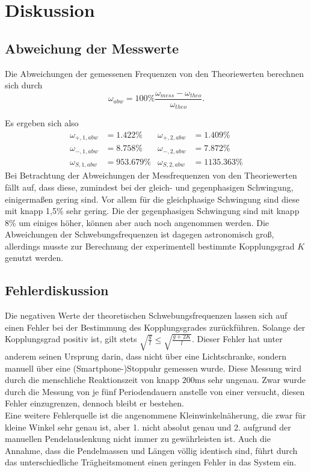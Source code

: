 \section{Diskussion}
\label{sec:Diskussion}

\subsection{Abweichung der Messwerte}
Die Abweichungen der gemessenen Frequenzen von den Theoriewerten berechnen sich durch
\begin{equation}
    ω_{abw} = 100\% \frac{ω_{mess}-ω_{theo}}{ω_{theo}} \text{.}
\end{equation}

Es ergeben sich also
\begin{align}
ω_{+,1,abw} & = 1.422\%   & ω_{+,2,abw} & = 1.409\% \\
ω_{-,1,abw} & = 8.758\%   & ω_{-,2,abw} & = 7.872\%\\
ω_{S,1,abw} & = 953.679\% & ω_{S,2,abw} & = 1135.363\%
\end{align}
Bei Betrachtung der Abweichungen der Messfrequenzen von den Theoriewerten fällt auf, dass diese, zumindest
bei der gleich- und gegenphasigen Schwingung, einigermaßen gering sind. Vor allem für die gleichphasige Schwingung
sind diese mit knapp 1,5\% sehr gering. Die der gegenphasigen Schwingung sind mit knapp 8\% um einiges höher, können aber auch noch angenommen werden.
Die Abweichungen der Schwebungsfrequenzen ist dagegen astronomisch groß, allerdings musste zur Berechnung der experimentell
bestimmte Kopplungsgrad $K$ genutzt werden.

\subsection{Fehlerdiskussion}

Die negativen Werte der theoretischen Schwebungsfrequenzen lassen sich auf einen Fehler bei der Bestimmung des Kopplungsgrades zurückführen.
Solange der Kopplungsgrad positiv ist, gilt stets $\sqrt{\frac{g}{l}}\leq \sqrt{\frac{g+2K}{l}}$.
Dieser Fehler hat unter anderem seinen Ursprung darin, dass nicht über eine Lichtschranke, sondern manuell über eine 
(Smartphone-)Stoppuhr gemessen wurde. Diese Messung wird durch die menschliche Reaktionszeit von knapp $200 \unit{\milli\second}$ sehr ungenau.
Zwar wurde durch die Messung von je fünf Periodendauern anstelle von einer versucht, diesen Fehler einzugrenzen, dennoch bleibt er bestehen. \\

Eine weitere Fehlerquelle ist die angenommene Kleinwinkelnäherung, die zwar für kleine Winkel sehr genau ist, aber 1. nicht absolut genau und 2. aufgrund der manuellen
Pendelauslenkung nicht immer zu gewährleisten ist. Auch die Annahme, dass die Pendelmassen und Längen völlig identisch sind, führt durch das unterschiedliche Trägheitsmoment einen geringen Fehler
in das System ein.
